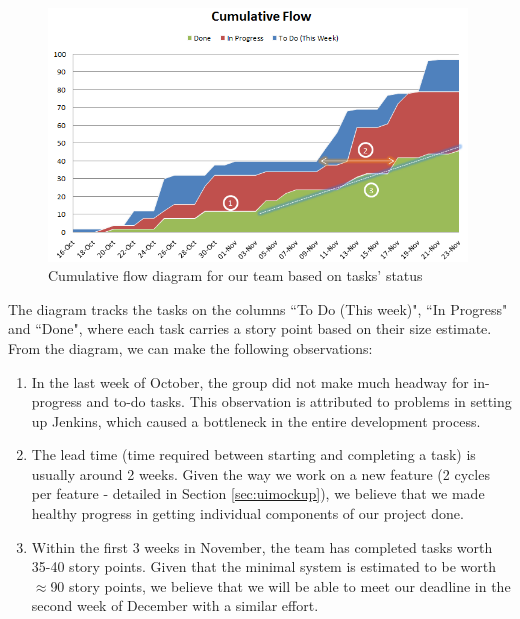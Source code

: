 \documentclass[a4paper, titlepage]{article}
\begin{document}
\begin{figure}[h!]
  \centering
    \includegraphics[width = 0.99\textwidth]{./eval/cumu_flow.png}
  \caption{Cumulative flow diagram for our team based on tasks' status}
  \label{fig:eval_cumuflow}
\end{figure}

The diagram tracks the tasks on the columns ``To Do (This week)", ``In Progress" and ``Done", where each task carries a story point based on their size estimate. From the diagram, we can make the following observations:

\begin{enumerate}

  \item In the last week of October, the group did not make much headway for in-progress and to-do tasks. This observation is attributed to problems in setting up Jenkins, which caused a bottleneck in the entire development process.

  \item The lead time (time required between starting and completing a task) is usually around 2 weeks. Given the way we work on a new feature (2 cycles per feature - detailed in Section \ref{sec:uimockup}), we believe that we made healthy progress in getting individual components of our project done.

  \item Within the first 3 weeks in November, the team has completed tasks worth 35-40 story points. Given that the minimal system is estimated to be worth $\approx$90 story points, we believe that we will be able to meet our deadline in the second week of December with a similar effort.

\end{enumerate}
\end{document}
